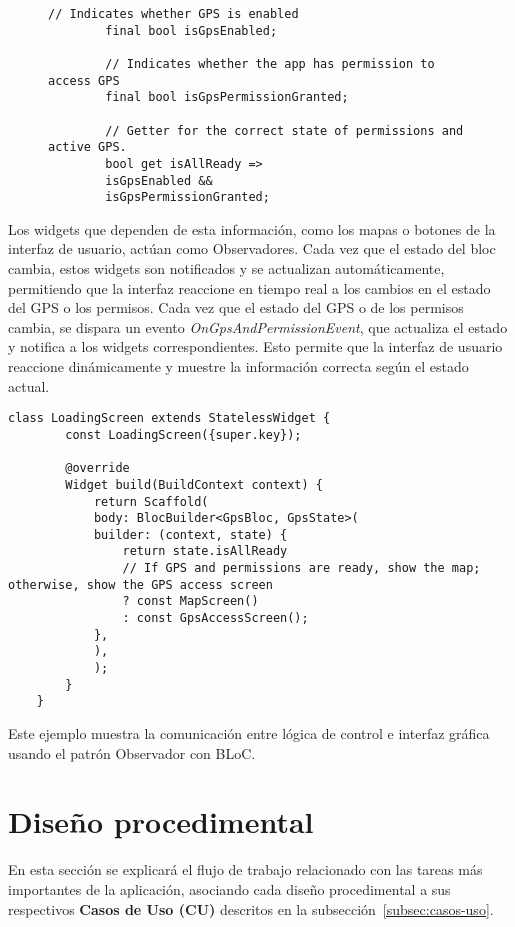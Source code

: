 \begin{figure}[htbp] %
	\centering
	\begin{lstlisting}[caption={Definición de variables de control en el BLoC}]
		// Indicates whether GPS is enabled
		final bool isGpsEnabled;
		
		// Indicates whether the app has permission to access GPS
		final bool isGpsPermissionGranted;
		
		// Getter for the correct state of permissions and active GPS.
		bool get isAllReady =>
		isGpsEnabled &&
		isGpsPermissionGranted;
	\end{lstlisting}
\end{figure}
Los widgets que dependen de esta información, como los mapas o botones de la interfaz de usuario, actúan como Observadores. Cada vez que el estado del \acrshort{bloc} cambia, estos widgets son notificados y se actualizan automáticamente, permitiendo que la interfaz reaccione en tiempo real a los cambios en el estado del GPS o los permisos.
Cada vez que el estado del GPS o de los permisos cambia, se dispara un evento \textit{OnGpsAndPermissionEvent}, que actualiza el estado y notifica a los widgets correspondientes. Esto permite que la interfaz de usuario reaccione dinámicamente y muestre la información correcta según el estado actual.

\begin{lstlisting}[caption={Carga en función del estado}]
	class LoadingScreen extends StatelessWidget {
		const LoadingScreen({super.key});
		
		@override
		Widget build(BuildContext context) {
			return Scaffold(
			body: BlocBuilder<GpsBloc, GpsState>(
			builder: (context, state) {
				return state.isAllReady 
				// If GPS and permissions are ready, show the map; otherwise, show the GPS access screen
				? const MapScreen()
				: const GpsAccessScreen();
			},
			),
			);
		}
	}
\end{lstlisting}	
Este ejemplo muestra la comunicación entre lógica de control e interfaz gráfica usando el patrón Observador con BLoC.


\section{Diseño procedimental}
En esta sección se explicará el flujo de trabajo relacionado con las tareas más importantes de la aplicación, asociando cada diseño procedimental a sus respectivos \textbf{Casos de Uso (CU)} descritos en la subsección~\ref{subsec:casos-uso}.

